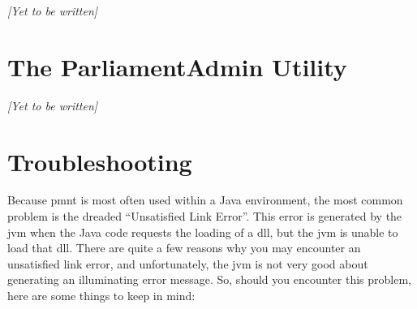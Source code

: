 \emph{[Yet to be written]}



\section{The ParliamentAdmin Utility}
\label{section-parliamentadmin-utility}

\emph{[Yet to be written]}



\section{Troubleshooting}
\label{section-troubleshooting}

Because \ac{pmnt} is most often used within a Java environment, the most common problem is the dreaded ``Unsatisfied Link Error''.  This error is generated by the \ac{jvm} when the Java code requests the loading of a \ac{dll}, but the \ac{jvm} is unable to load that \ac{dll}.  There are quite a few reasons why you may encounter an unsatisfied link error, and unfortunately, the \ac{jvm} is not very good about generating an illuminating error message.  So, should you encounter this problem, here are some things to keep in mind:
